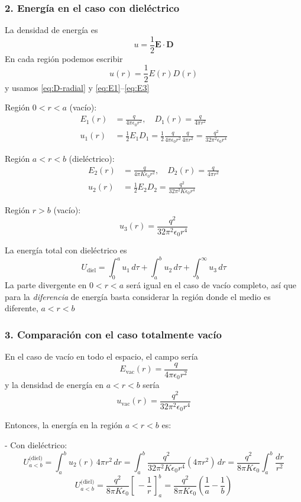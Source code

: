 \documentclass{article}
\begin{document}
\subsubsection*{2. Energía en el caso con dieléctrico}

La densidad de energía es
\begin{equation}
u = \frac{1}{2}\mathbf{E}\cdot\mathbf{D}
\label{eq:u-ED}
\end{equation}
En cada región podemos escribir
\[
u(r) = \frac{1}{2}E(r)D(r)
\]
y usamos \eqref{eq:D-radial} y \eqref{eq:E1}–\eqref{eq:E3}

Región $0<r<a$ (vacío):
\begin{align}
E_{1}(r) &= \frac{q}{4\pi\epsilon_{0}r^{2}}, \quad
D_{1}(r) = \frac{q}{4\pi r^{2}}
\\[4pt]
u_{1}(r) &= \frac{1}{2}E_{1}D_{1}
= \frac{1}{2}\frac{q}{4\pi\epsilon_{0}r^{2}}\frac{q}{4\pi r^{2}}
= \frac{q^{2}}{32\pi^{2}\epsilon_{0}r^{4}}
\end{align}

Región $a<r<b$ (dieléctrico):
\begin{align}
E_{2}(r) &= \frac{q}{4\pi K\epsilon_{0}r^{2}}, \quad
D_{2}(r) = \frac{q}{4\pi r^{2}}
\\[4pt]
u_{2}(r) &= \frac{1}{2}E_{2}D_{2}
= \frac{q^{2}}{32\pi^{2}K\epsilon_{0}r^{4}}
\end{align}

Región $r>b$ (vacío):
\[
u_{3}(r) = \frac{q^{2}}{32\pi^{2}\epsilon_{0}r^{4}}
\]

La energía total con dieléctrico es
\[
U_{\text{diel}} = \int_{0}^{a}u_{1}\,d\tau
+ \int_{a}^{b}u_{2}\,d\tau
+ \int_{b}^{\infty}u_{3}\,d\tau
\]
La parte divergente en $0<r<a$ será igual en el caso de vacío completo, así que para la \emph{diferencia} de energía basta considerar la región donde el medio es diferente, $a<r<b$

\subsubsection*{3. Comparación con el caso totalmente vacío}

En el caso de vacío en todo el espacio, el campo sería
\[
E_{\text{vac}}(r) = \frac{q}{4\pi\epsilon_{0}r^{2}}
\]
y la densidad de energía en $a<r<b$ sería
\[
u_{\text{vac}}(r) = \frac{q^{2}}{32\pi^{2}\epsilon_{0}r^{4}}
\]

Entonces, la energía en la región $a<r<b$ es:

- Con dieléctrico:
\[
U_{a<b}^{\text{(diel)}} = \int_{a}^{b}u_{2}(r)\,4\pi r^{2}\,dr
= \int_{a}^{b}\frac{q^{2}}{32\pi^{2}K\epsilon_{0}r^{4}}(4\pi r^{2})\,dr
= \frac{q^{2}}{8\pi K\epsilon_{0}}\int_{a}^{b}\frac{dr}{r^{2}}
\]
\[
U_{a<b}^{\text{(diel)}} 
= \frac{q^{2}}{8\pi K\epsilon_{0}}\left[\,-\frac{1}{r}\,\right]_{a}^{b}
= \frac{q^{2}}{8\pi K\epsilon_{0}}\left(\frac{1}{a} - \frac{1}{b}\right)
\]
\end{document}
